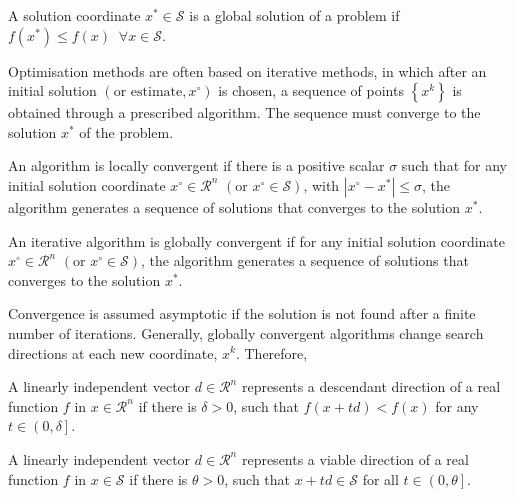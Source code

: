 \begin{defn}
   A solution coordinate $x^{\ast}\in\mathcal{S}$ is a global solution of a problem if $f\left(x^{\ast}\right)\leq f\left(x\right)\;\;\forall x\in\mathcal{S}$.
\end{defn}

\bigskip
Optimisation methods are often based on iterative methods, in which after an initial solution $\left(\text{or estimate}, x^{\circ}\right)$ is chosen, a sequence of points $\left\{x^{k}\right\}$ is obtained through a prescribed algorithm. The sequence must converge to the solution $x^{\ast}$ of the problem.
\begin{defn}
   An algorithm is locally convergent if there is a positive scalar $\sigma$ such that for any initial solution coordinate $x^{\circ}\in\mathcal{R}^{n}$ $\left(\text{or } x^{\circ}\in\mathcal{S}\right)$, with $\left|x^{\circ}-x^{\ast}\right|\leq\sigma$, the algorithm generates a sequence of solutions that converges to the solution $x^{\ast}$.
\end{defn}

\begin{defn}
   An iterative algorithm is globally convergent if for any initial solution coordinate $x^{\circ}\in\mathcal{R}^{n}$ $\left(\text{or } x^{\circ}\in\mathcal{S}\right)$, the algorithm generates a sequence of solutions that converges to the solution $x^{\ast}$.
\end{defn}

\bigskip
Convergence is assumed asymptotic if the solution is not found after a finite number of iterations. Generally, globally convergent algorithms change search directions at each new coordinate, $x^{k}$. Therefore,

\begin{defn} A linearly independent vector $d\in\mathcal{R}^{n}$ represents a descendant direction of a real function $f$ in $x\in\mathcal{R}^{n}$ if there is $\delta>0$, such that $f\left(x+t d\right)<f\left(x\right)$ for any $t\in\left.\left(0,\delta\right.\right]$.   
\end{defn}

\begin{defn} A linearly independent vector $d\in\mathcal{R}^{n}$ represents a viable direction of a real function $f$ in $x\in\mathcal{S}$ if there is $\theta >0$, such that $x+t d\in \mathcal{S}$ for all $t\in\left.\left(0,\theta\right.\right]$.   
\end{defn}

